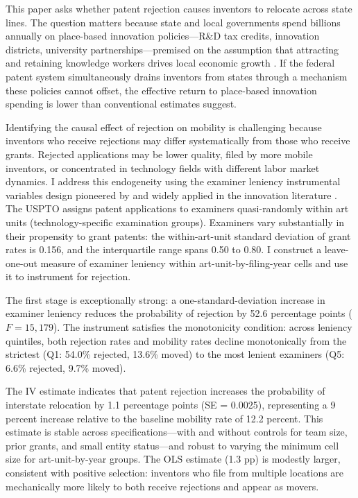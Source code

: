 \documentclass[12pt]{article}
\begin{document}
This paper asks whether patent rejection causes inventors to relocate across state lines. The question matters because state and local governments spend billions annually on place-based innovation policies---R\&D tax credits, innovation districts, university partnerships---premised on the assumption that attracting and retaining knowledge workers drives local economic growth \citep{moretti2019, gruber2019}. If the federal patent system simultaneously drains inventors from states through a mechanism these policies cannot offset, the effective return to place-based innovation spending is lower than conventional estimates suggest.

Identifying the causal effect of rejection on mobility is challenging because inventors who receive rejections may differ systematically from those who receive grants. Rejected applications may be lower quality, filed by more mobile inventors, or concentrated in technology fields with different labor market dynamics. I address this endogeneity using the examiner leniency instrumental variables design pioneered by \citet{sampat2019} and widely applied in the innovation literature \citep{galasso2015, farre-mensa2020, righi2023}. The USPTO assigns patent applications to examiners quasi-randomly within art units (technology-specific examination groups). Examiners vary substantially in their propensity to grant patents: the within-art-unit standard deviation of grant rates is 0.156, and the interquartile range spans 0.50 to 0.80. I construct a leave-one-out measure of examiner leniency within art-unit-by-filing-year cells and use it to instrument for rejection.

The first stage is exceptionally strong: a one-standard-deviation increase in examiner leniency reduces the probability of rejection by 52.6 percentage points ($F = 15{,}179$). The instrument satisfies the monotonicity condition: across leniency quintiles, both rejection rates and mobility rates decline monotonically from the strictest (Q1: 54.0\% rejected, 13.6\% moved) to the most lenient examiners (Q5: 6.6\% rejected, 9.7\% moved).

The IV estimate indicates that patent rejection increases the probability of interstate relocation by 1.1 percentage points (SE = 0.0025), representing a 9 percent increase relative to the baseline mobility rate of 12.2 percent. This estimate is stable across specifications---with and without controls for team size, prior grants, and small entity status---and robust to varying the minimum cell size for art-unit-by-year groups. The OLS estimate (1.3 pp) is modestly larger, consistent with positive selection: inventors who file from multiple locations are mechanically more likely to both receive rejections and appear as movers.
\end{document}

